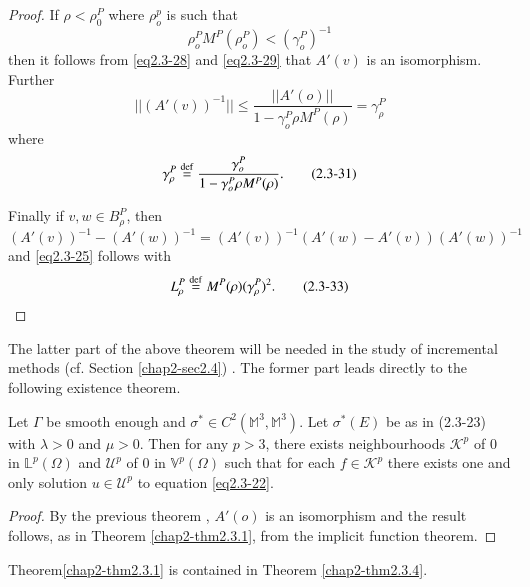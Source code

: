 \begin{proof}
  If $\rho < \rho _{0}^{P}$ where $ \rho_{o}^p$ is such that
  \begin{equation*}
    \rho_o ^P M^P ( \rho_o ^P ) < ( \gamma _o ^P
  )^{-1} \tag{2.3-31}\label{eq2.3-31} 
  \end{equation*}\pageoriginale
  then it follows from \eqref{eq2.3-28} and \eqref{eq2.3-29} that $A'
  (v)$ is an isomorphism. Further 
  $$ 
    || ( A' (v))^{-1}|| \leq \frac{|| A' (o) ||}{1-\gamma _o ^P
      \rho M ^P (\rho)}= \gamma _\rho ^{P}
$$
where
\begin{equation*}
\gamma _\rho ^P \overset{\operatorname{def}}{=} \frac{\gamma _o ^P}{1 -
      \gamma _o ^P \rho M^P ( \rho)}.\tag{2.3-31}\label{eq2.3-32}  
\end{equation*}
  
Finally if $v, w \in B_\rho ^ P $, then
$$
(A'(v))^{-1} -(A' (w))^{-1} = (A'(v))^{-1} (A'(w)-A'(v)) (A'(w))^{-1}
$$
and \eqref{eq2.3-25} follows with 
  \begin{equation*}
    L_\rho ^P \overset{\operatorname{def}}{=} M^P (\rho ) ( \gamma_{\rho}
    ^{P})^2 . \tag{2.3-33} \label{eq2.3-33}
  \end{equation*}
  \end{proof}

  The latter part of the above theorem will be needed in the study of
  incremental methods (cf. Section \ref{chap2-sec2.4}) . The former
  part leads directly to the following existence theorem. 


\begin{theorem}\label{chap2-thm2.3.4}%
   Let $\Gamma$ be smooth enough and $\sigma^* \in C^2( \mathbb{M}^3,
   \mathbb{M}^3)$. Let $\sigma^* (E) $ be as in (2.3-23) with
   $\lambda > 0 $ and $\mu > 0$. Then for any $p>3$, there exists
   neighbourhoods $\mathscr{K}^p$ of 0 in $\mathbb{L}^p(\Omega)$ and
   $\mathscr{U}^p$ of $0$ in $\mathbb{V}^p(\Omega)$ such that for each
   $f \in \mathscr{K}^p$ there exists one and only solution $u \in
   \mathscr{U}^p$ to equation \eqref{eq2.3-22}. 
\end{theorem} 

\begin{proof}
   By the previous theorem , $A'(o)$ is an isomorphism and the result
   follows, as in Theorem \ref{chap2-thm2.3.1}, 
   from the implicit function theorem. 
 \end{proof} 

 \begin{remark}\label{chap2-rem2.3.4}%
   Theorem\pageoriginale \ref{chap2-thm2.3.1} is contained in
   Theorem \ref{chap2-thm2.3.4}.  
   \end{remark}

